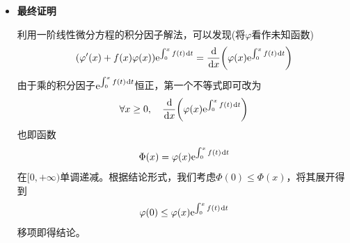 \documentclass[a4paper,UTF8,fontset=windows,AutoFakeBold]{ctexart}
\newcommand*{\dr}{\hspace{0.07em}\mathrm{d}}
\newcommand*{\er}{\mathrm{e}}
\theoremstyle{ex}
\begin{document}
\begin{enumerate}
{\begin{itemize}
            先观察条件本身的形式。条件中出现了一个特殊的函数$\er^{-\int_0^xf(t)\dr t}$，而这类型的表达式在\textbf{一阶常系数线性微分方程}中常见。利用相关的理论，可发现它和另一个条件$\varphi'(x)+f(x)\varphi(x)$的\textbf{积分因子}类似，具体来说，利用复合函数求导公式与变上限积分的导数结论，计算可以得到
            $$(\varphi'(x)+f(x)\varphi(x))\er^{\int_0^xf(t)\dr t}=\frac{\dr}{\dr x}\bigg(\varphi(x)\er^{\int_0^xf(t)\dr t}\bigg)$$
            这可以将条件转化为一个函数单调减，而这已经接近结论。

            \item \textbf{最终证明}
            
            利用一阶线性微分方程的积分因子解法，可以发现(将$\varphi$看作未知函数)
            $$(\varphi'(x)+f(x)\varphi(x))\er^{\int_0^xf(t)\dr t}=\frac{\dr}{\dr x}\bigg(\varphi(x)\er^{\int_0^xf(t)\dr t}\bigg)$$
            由于乘的积分因子$\er^{\int_0^xf(t)\dr t}$恒正，第一个不等式即可改为
            $$\forall x\ge0,\quad\frac{\dr}{\dr x}\bigg(\varphi(x)\er^{\int_0^xf(t)\dr t}\bigg)$$
            也即函数
            $$\Phi(x)=\varphi(x)\er^{\int_0^xf(t)\dr t}$$
            在$[0,+\infty)$单调递减。根据结论形式，我们考虑$\Phi(0)\le\Phi(x)$，将其展开得到
            $$\varphi(0)\le\varphi(x)\er^{\int_0^xf(t)\dr t}$$
            移项即得结论。
        \end{itemize}
    }
\end{enumerate}
\end{document}
